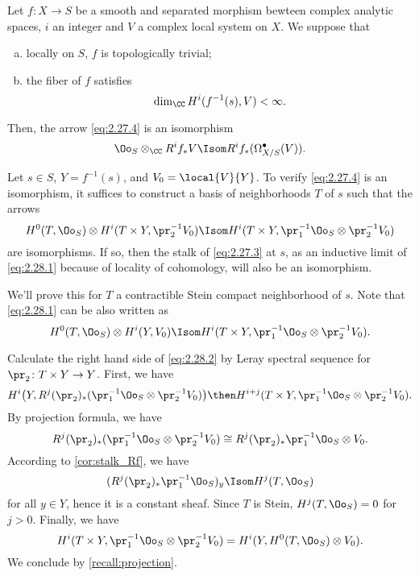 \begin{proposition}\label{prop:Gauss-Manin}
  Let $f\colon X\to S$ be a smooth and separated morphism bewteen complex
  analytic spaces, $i$ an integer and $V$ a complex local system on $X$.
  We suppose that
  \begin{enumerate}[a)]
    \item locally on $S$, $f$ is topologically trivial;
    \item the fiber of $f$ satisfies
    \[
    \dim_{\CC}H^i(f^{-1}(s),V)<\infty.
    \]
  \end{enumerate}
  Then, the arrow \cref{eq:2.27.4} is an isomorphism
  \[
  \Oo_S\otimes_{\CC}R^if_{\ast}V\Isom R^if_{\ast}(\Omega_{X/S}^\bullet(V)).
  \]
\end{proposition}

Let $s\in S$, $Y=f^{-1}(s)$, and $V_0=\local{V}{Y}$. To verify \cref{eq:2.27.4}
is an isomorphism, it suffices to construct a basis of neighborhoods $T$ of $s$
such that the arrows
\begin{equation}\label{eq:2.28.1}
  H^0(T,\Oo_S)\otimes H^i(T\times Y,\pr_2^{-1}V_0)\Isom
  H^i(T\times Y,\pr_1^{-1}\Oo_S\otimes\pr_2^{-1}V_0)
\end{equation}
are isomorphisms.
If so, then the stalk of \cref{eq:2.27.3} at $s$, as an inductive limit of
\cref{eq:2.28.1} because of locality of cohomology, will also be an isomorphism.

We'll prove this for $T$ a contractible Stein compact neighborhood of $s$.
Note that \cref{eq:2.28.1} can be also written as
\begin{equation}\label{eq:2.28.2}
  H^0(T,\Oo_S)\otimes H^i(Y,V_0)\Isom
  H^i(T\times Y,\pr_1^{-1}\Oo_S\otimes\pr_2^{-1}V_0).
\end{equation}

Calculate the right hand side of \cref{eq:2.28.2} by Leray spectral sequence
for $\pr_2\colon T\times Y\to Y$. First, we have
\[
H^i\big(Y,R^j(\pr_2)_\ast(\pr_1^{-1}\Oo_S\otimes\pr_2^{-1}V_0)\big)
\then
H^{i+j}(T\times Y,\pr_1^{-1}\Oo_S\otimes\pr_2^{-1}V_0).
\]
By projection formula, we have
\[
R^j(\pr_2)_\ast(\pr_1^{-1}\Oo_S\otimes\pr_2^{-1}V_0) \cong
R^j(\pr_2)_\ast\pr_1^{-1}\Oo_S\otimes V_0.
\]
According to \ref{cor:stalk_Rf}, we have
\[
(R^j(\pr_2)_\ast\pr_1^{-1}\Oo_S)_y
\Isom H^j(T,\Oo_S)
\]
for all $y\in Y$, hence it is a constant sheaf.
Since $T$ is Stein, $H^j(T,\Oo_S)=0$ for $j>0$.
Finally, we have
\[
H^i(T\times Y,\pr_1^{-1}\Oo_S\otimes\pr_2^{-1}V_0)
=H^i(Y,H^0(T,\Oo_S)\otimes V_0).
\]
We conclude by \ref{recall:projection}.

